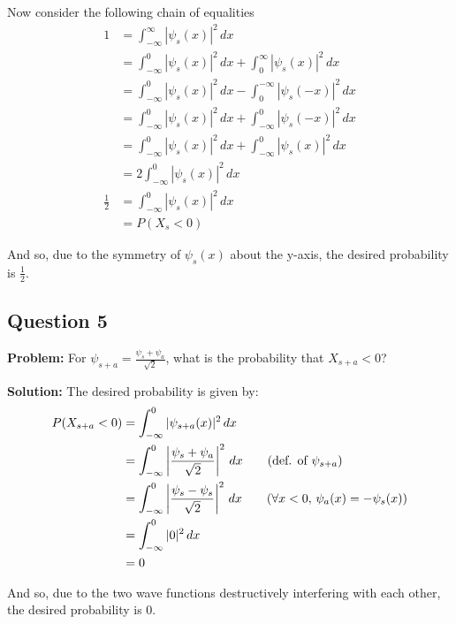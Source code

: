 \documentclass{article}
\begin{document}
Now consider the following chain of equalities
\begin{align*}
    1&=\int_{-\infty}^\infty|\psi_s(x)|^2\,dx\tag{integral of a pdf over support is 1}\\
    &=\int_{-\infty}^0|\psi_s(x)|^2\,dx+\int_0^\infty|\psi_s(x)|^2\,dx\\
    &=\int_{-\infty}^0|\psi_s(x)|^2\,dx-\int_0^{-\infty}|\psi_s(-x)|^2\,dx\tag{expansion of interval of integration by $-1$}\\
    &=\int_{-\infty}^0|\psi_s(x)|^2\,dx+\int_{-\infty}^0|\psi_s(-x)|^2\,dx\tag{reverse interval of integration}\\
    &=\int_{-\infty}^0|\psi_s(x)|^2\,dx+\int_{-\infty}^0|\psi_s(x)|^2\,dx\tag{$\psi_s$ is an even function}\\
    &=2\int_{-\infty}^0|\psi_s(x)|^2\,dx\\
    \frac{1}{2}&=\int_{-\infty}^0|\psi_s(x)|^2\,dx\\
    &=P(X_s<0)
\end{align*}

And so, due to the symmetry of $\psi_s(x)$ about the y-axis, the desired probability is $\frac{1}{2}$.

\subsection*{Question 5}
\noindent\textbf{Problem:} For $\psi_{s+a}=\frac{\psi_s+\psi_a}{\sqrt{2}}$, what is the probability that $X_{s+a}<0$?
\bigskip

\noindent\textbf{Solution:} The desired probability is given by:
\begin{align*}
    P(X_{s+a}<0)&=\int_{-\infty}^0|\psi_{s+a}(x)|^2\,dx\\
    &=\int_{-\infty}^0\left|\frac{\psi_s+\psi_a}{\sqrt{2}}\right|^2\,dx\tag{def. of $\psi_{s+a}$}\\
    &=\int_{-\infty}^0\left|\frac{\psi_s-\psi_s}{\sqrt{2}}\right|^2\,dx\tag{$\forall x<0,\, \psi_a(x)=-\psi_s(x)$}\\
    &=\int_{-\infty}^0|0|^2\,dx\\
    &=0
\end{align*}

And so, due to the two wave functions destructively interfering with each other, the desired probability is 0.
\end{document}
